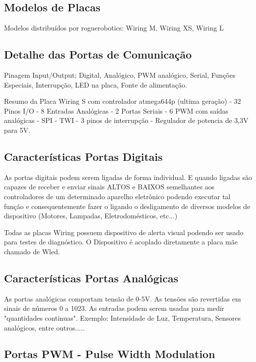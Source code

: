 \subsection[Modelos de Placas]{Modelos de Placas}
Modelos distribuídos por roguerobotics: Wiring M, Wiring XS, Wiring L

\subsection[Detalhe das Portas de Comunicação]{Detalhe das Portas de Comunicação}

Pinagem Input/Output; Digital, Analógico, PWM analógico, Serial, Funções Especiais, Interrupção, LED na placa, Fonte de alimentação.

Resumo da Placa Wiring S com controlador atmega644p (ultima geração)
	- 32 Pinos I/O
	- 8 Entradas Analógicas
	- 2 Portas Seriais
	- 6 PWM com saídas analógicas 
	- SPI
	- TWI
	- 3 pinos de interrupção
    - Regulador de potencia de 3,3V para 5V.

\subsection[Características Portas Digitais]{Características Portas Digitais}

As portas digitais podem serem ligadas de forma individual. E quando ligadas são capazes de receber e enviar sinais ALTOS e BAIXOS semelhantes aos controladores de um determinado aparelho eletrônico podendo executar tal função e consequentemente fazer o ligando o desligamento de diversos modelos de dispositivo (Motores, Lampadas, Eletrodomésticos, etc...)

Todas as placas Wiring possuem dispositivo de alerta visual podendo ser usado para testes de diagnóstico. O Dispositivo é acoplado diretamente a placa mãe chamado de Wled.

\subsection[Características Portas Analógicas]{Características Portas Analógicas}

As portas analógicas comportam tensão de 0-5V. As tensões são revertidas em sinais de números  0 a 1023. 
As entradas podem serem usadas para medir "quantidades continuas". Exemplo: Intensidade de Luz, Temperatura, Sensores analógicos, entre outros.....

\subsection[Portas PWM - Pulse Width Modulation]{Portas PWM - Pulse Width Modulation}

